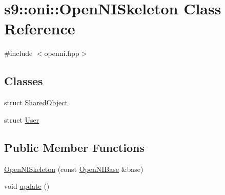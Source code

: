 \hypertarget{classs9_1_1oni_1_1OpenNISkeleton}{\section{s9\-:\-:oni\-:\-:\-Open\-N\-I\-Skeleton \-Class \-Reference}
\label{classs9_1_1oni_1_1OpenNISkeleton}
}


{\ttfamily \#include $<$openni.\-hpp$>$}

\subsection*{\-Classes}
\begin{DoxyCompactItemize}
\item 
struct \hyperlink{structs9_1_1oni_1_1OpenNISkeleton_1_1SharedObject}{\-Shared\-Object}
\item 
struct \hyperlink{structs9_1_1oni_1_1OpenNISkeleton_1_1User}{\-User}
\end{DoxyCompactItemize}
\subsection*{\-Public \-Member \-Functions}
\begin{DoxyCompactItemize}
\item 
\hyperlink{classs9_1_1oni_1_1OpenNISkeleton_a24c6f7cccbc8d0c319e977f17bd2109c}{\-Open\-N\-I\-Skeleton} (const \hyperlink{classs9_1_1oni_1_1OpenNIBase}{\-Open\-N\-I\-Base} \&base)
\item 
void \hyperlink{classs9_1_1oni_1_1OpenNISkeleton_a785d6e82ac21748116fccec0967b6533}{update} ()
\end{DoxyCompactItemize}
